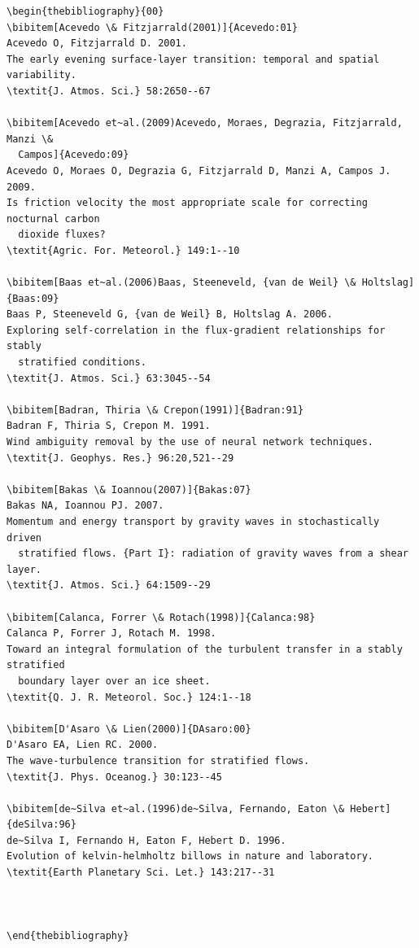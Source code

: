 \documentclass{ar-1col}
\begin{document}
\begin{verbatim}
\begin{thebibliography}{00}
\bibitem[Acevedo \& Fitzjarrald(2001)]{Acevedo:01}
Acevedo O, Fitzjarrald D. 2001.
The early evening surface-layer transition: temporal and spatial variability.
\textit{J. Atmos. Sci.} 58:2650--67

\bibitem[Acevedo et~al.(2009)Acevedo, Moraes, Degrazia, Fitzjarrald, Manzi \&
  Campos]{Acevedo:09}
Acevedo O, Moraes O, Degrazia G, Fitzjarrald D, Manzi A, Campos J. 2009.
Is friction velocity the most appropriate scale for correcting nocturnal carbon
  dioxide fluxes?
\textit{Agric. For. Meteorol.} 149:1--10

\bibitem[Baas et~al.(2006)Baas, Steeneveld, {van de Weil} \& Holtslag]{Baas:09}
Baas P, Steeneveld G, {van de Weil} B, Holtslag A. 2006.
Exploring self-correlation in the flux-gradient relationships for stably
  stratified conditions.
\textit{J. Atmos. Sci.} 63:3045--54

\bibitem[Badran, Thiria \& Crepon(1991)]{Badran:91}
Badran F, Thiria S, Crepon M. 1991.
Wind ambiguity removal by the use of neural network techniques.
\textit{J. Geophys. Res.} 96:20,521--29

\bibitem[Bakas \& Ioannou(2007)]{Bakas:07}
Bakas NA, Ioannou PJ. 2007.
Momentum and energy transport by gravity waves in stochastically driven
  stratified flows. {Part I}: radiation of gravity waves from a shear layer.
\textit{J. Atmos. Sci.} 64:1509--29

\bibitem[Calanca, Forrer \& Rotach(1998)]{Calanca:98}
Calanca P, Forrer J, Rotach M. 1998.
Toward an integral formulation of the turbulent transfer in a stably stratified
  boundary layer over an ice sheet.
\textit{Q. J. R. Meteorol. Soc.} 124:1--18

\bibitem[D'Asaro \& Lien(2000)]{DAsaro:00}
D'Asaro EA, Lien RC. 2000.
The wave-turbulence transition for stratified flows.
\textit{J. Phys. Oceanog.} 30:123--45

\bibitem[de~Silva et~al.(1996)de~Silva, Fernando, Eaton \& Hebert]{deSilva:96}
de~Silva I, Fernando H, Eaton F, Hebert D. 1996.
Evolution of kelvin-helmholtz billows in nature and laboratory.
\textit{Earth Planetary Sci. Let.} 143:217--31



\end{thebibliography}
\end{verbatim}
\end{document}
